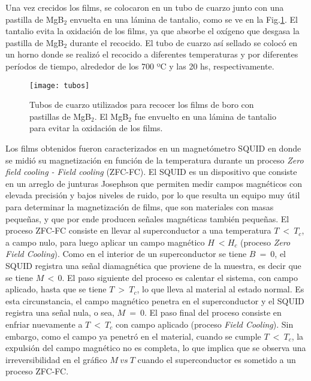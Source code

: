 \newpage
Una vez crecidos los films, se colocaron en un tubo de cuarzo junto con una pastilla de MgB$_2$ envuelta en una lámina de tantalio, como se ve en la Fig.\ref{fig:tubos}. El tantalio evita la oxidación de los films, ya que absorbe el oxígeno que desgasa la pastilla de MgB$_2$ durante el recocido\cite{Barrabas2011}.
El tubo de cuarzo así sellado se colocó en un horno donde se realizó el recocido a diferentes temperaturas y por diferentes períodos de tiempo, alrededor de los 700 ºC y las 20 hs, respectivamente.
\begin{figure}[tbh!]
 \begin{center}
    \texttt{[image: tubos]}
  \end{center}
\caption[Tubos de cuarzo utilizados para recocer los films de boro con pastillas de MgB$_2$.]{Tubos de cuarzo utilizados para recocer los films de boro con pastillas de MgB$_2$. El MgB$_2$ fue envuelto 
en una lámina de tantalio para evitar la oxidación de los films.}
\label{fig:tubos}
\end{figure}

Los films obtenidos fueron caracterizados en un magnetómetro SQUID en donde se midió su magnetización en función de la temperatura durante un proceso \textit{Zero field cooling - Field cooling} (ZFC-FC). El SQUID es un dispositivo que consiste en un arreglo de junturas Josephson que permiten medir campos magnéticos con elevada precisión y bajos niveles de ruido, por lo que resulta un equipo muy útil para determinar la magnetización de films, que son materiales con masas pequeñas, y que por ende producen señales magnéticas también pequeñas. El proceso ZFC-FC consiste en llevar al superconductor a una temperatura $T\ < \ T_{c}$, a campo nulo, para luego aplicar un campo magnético $H \ < H_c$ (proceso \textit{Zero Field Cooling}). Como en el interior de un superconductor se tiene $B\ = \ 0$, el SQUID registra una señal diamagnética que proviene de la muestra, es decir que se tiene $M \, < \, 0$. El paso siguiente del proceso es calentar el sistema, con campo aplicado, hasta que se tiene $T \ > \ T_c$, lo que lleva al material al estado normal. Es esta circunstancia, el campo magnético penetra en el superconductor y el SQUID registra una señal nula, o sea, $M \ = \ 0$. El paso final del proceso consiste en enfriar nuevamente a $T \ < \ T_c$ con campo aplicado (proceso \textit{Field Cooling}). Sin embargo, como el campo ya penetró en el material, cuando se cumple $T \ < \ T_c$, la expulsión del campo magnético no es completa, lo que implica que se observa una irreversibilidad en el gráfico $M \ vs \ T$ cuando el superconductor es sometido a un proceso ZFC-FC.

